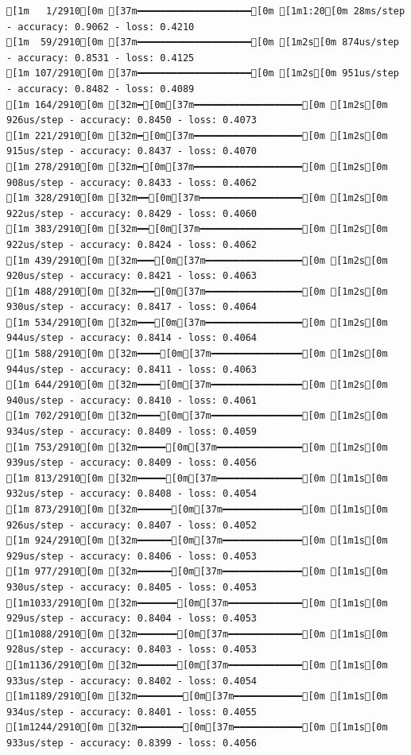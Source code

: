 \documentclass[
  letterpaper,
  DIV=11,
  numbers=noendperiod]{scrartcl}
\begin{document}
\begin{verbatim}
[1m   1/2910[0m [37m━━━━━━━━━━━━━━━━━━━━[0m [1m1:20[0m 28ms/step - accuracy: 0.9062 - loss: 0.4210
[1m  59/2910[0m [37m━━━━━━━━━━━━━━━━━━━━[0m [1m2s[0m 874us/step - accuracy: 0.8531 - loss: 0.4125 
[1m 107/2910[0m [37m━━━━━━━━━━━━━━━━━━━━[0m [1m2s[0m 951us/step - accuracy: 0.8482 - loss: 0.4089
[1m 164/2910[0m [32m━[0m[37m━━━━━━━━━━━━━━━━━━━[0m [1m2s[0m 926us/step - accuracy: 0.8450 - loss: 0.4073
[1m 221/2910[0m [32m━[0m[37m━━━━━━━━━━━━━━━━━━━[0m [1m2s[0m 915us/step - accuracy: 0.8437 - loss: 0.4070
[1m 278/2910[0m [32m━[0m[37m━━━━━━━━━━━━━━━━━━━[0m [1m2s[0m 908us/step - accuracy: 0.8433 - loss: 0.4062
[1m 328/2910[0m [32m━━[0m[37m━━━━━━━━━━━━━━━━━━[0m [1m2s[0m 922us/step - accuracy: 0.8429 - loss: 0.4060
[1m 383/2910[0m [32m━━[0m[37m━━━━━━━━━━━━━━━━━━[0m [1m2s[0m 922us/step - accuracy: 0.8424 - loss: 0.4062
[1m 439/2910[0m [32m━━━[0m[37m━━━━━━━━━━━━━━━━━[0m [1m2s[0m 920us/step - accuracy: 0.8421 - loss: 0.4063
[1m 488/2910[0m [32m━━━[0m[37m━━━━━━━━━━━━━━━━━[0m [1m2s[0m 930us/step - accuracy: 0.8417 - loss: 0.4064
[1m 534/2910[0m [32m━━━[0m[37m━━━━━━━━━━━━━━━━━[0m [1m2s[0m 944us/step - accuracy: 0.8414 - loss: 0.4064
[1m 588/2910[0m [32m━━━━[0m[37m━━━━━━━━━━━━━━━━[0m [1m2s[0m 944us/step - accuracy: 0.8411 - loss: 0.4063
[1m 644/2910[0m [32m━━━━[0m[37m━━━━━━━━━━━━━━━━[0m [1m2s[0m 940us/step - accuracy: 0.8410 - loss: 0.4061
[1m 702/2910[0m [32m━━━━[0m[37m━━━━━━━━━━━━━━━━[0m [1m2s[0m 934us/step - accuracy: 0.8409 - loss: 0.4059
[1m 753/2910[0m [32m━━━━━[0m[37m━━━━━━━━━━━━━━━[0m [1m2s[0m 939us/step - accuracy: 0.8409 - loss: 0.4056
[1m 813/2910[0m [32m━━━━━[0m[37m━━━━━━━━━━━━━━━[0m [1m1s[0m 932us/step - accuracy: 0.8408 - loss: 0.4054
[1m 873/2910[0m [32m━━━━━━[0m[37m━━━━━━━━━━━━━━[0m [1m1s[0m 926us/step - accuracy: 0.8407 - loss: 0.4052
[1m 924/2910[0m [32m━━━━━━[0m[37m━━━━━━━━━━━━━━[0m [1m1s[0m 929us/step - accuracy: 0.8406 - loss: 0.4053
[1m 977/2910[0m [32m━━━━━━[0m[37m━━━━━━━━━━━━━━[0m [1m1s[0m 930us/step - accuracy: 0.8405 - loss: 0.4053
[1m1033/2910[0m [32m━━━━━━━[0m[37m━━━━━━━━━━━━━[0m [1m1s[0m 929us/step - accuracy: 0.8404 - loss: 0.4053
[1m1088/2910[0m [32m━━━━━━━[0m[37m━━━━━━━━━━━━━[0m [1m1s[0m 928us/step - accuracy: 0.8403 - loss: 0.4053
[1m1136/2910[0m [32m━━━━━━━[0m[37m━━━━━━━━━━━━━[0m [1m1s[0m 933us/step - accuracy: 0.8402 - loss: 0.4054
[1m1189/2910[0m [32m━━━━━━━━[0m[37m━━━━━━━━━━━━[0m [1m1s[0m 934us/step - accuracy: 0.8401 - loss: 0.4055
[1m1244/2910[0m [32m━━━━━━━━[0m[37m━━━━━━━━━━━━[0m [1m1s[0m 933us/step - accuracy: 0.8399 - loss: 0.4056

\end{verbatim}
\end{document}
